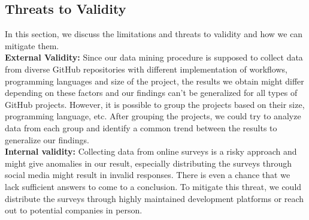 \documentclass[conference]{IEEEtran}
\begin{document}
\subsection{Threats to Validity}
In this section, we discuss the limitations and threats to
validity and how we can mitigate them.\\

\textbf{External Validity:} Since our data mining procedure is supposed to collect data from diverse GitHub repositories with different implementation of workflows, programming languages and size of the project, the results we obtain might differ depending on these factors and our findings can’t be generalized for all types of GitHub projects. However, it is possible to group the projects based on their size, programming language, etc. After grouping the projects, we could try to analyze data from each group and identify a common trend between the results to generalize our findings.\\

\textbf{Internal validity:} Collecting data from online surveys is a risky approach and might give anomalies in our result, especially distributing the surveys through social media might result in invalid responses. There is even a chance that we lack sufficient answers to come to a conclusion. To mitigate this threat, we could distribute the surveys through highly maintained development platforms or reach out to potential companies in person. 
\end{document}
